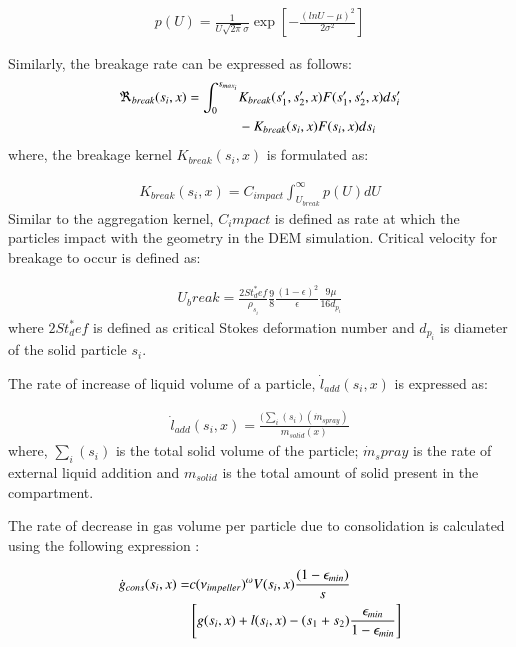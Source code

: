 \documentclass[preprint,10pt,authoryear,review]{elsarticle}
\begin{document}
\begin{linenumbers}
\begin{align}
p(U) = \frac{1}{U\sqrt{2\pi}\sigma}\exp\left[-\frac{(lnU-\mu)^2}{2\sigma^2}\right]
\label{eqn:mthds_pbm_agg_lognormVelo}
\end{align}

Similarly, the breakage rate can be expressed as follows:
\begin{align}
\Re_{break}(s_i,x)  = \int_0^{s_{max_i}} & \notag
K_{break}(s_1',s_2',x)F(s_1',s_2',x)ds_i' \\ &  - K_{break}(s_i,x)F(s_i,x)ds_i
\label{eqn:mthds_pbm_breakage_geneq}
\end{align}   
where, the breakage kernel $K_{break}(s_i,x)$ is formulated as: 

\begin{align}
K_{break}(s_i,x) = C_{impact}\int_{U_{break}}^{\infty}p(U)dU
\label{eqn:mthds_pbm_breakage_kernel}
\end{align}
Similar to the aggregation kernel, $C_impact$ is defined as rate at which 
the particles impact with the geometry in the DEM simulation. Critical velocity 
for breakage to occur is defined as:

\begin{align}
U_break=\frac{2St^*_def}{\rho_{s_i}}\frac{9}{8}\frac{(1-\epsilon)^2}{\epsilon}\frac{9\mu}{16d_{p_i}}
\label{eqn:mthds_pbm_breakage_ubreak}
\end{align}
where $2St^*_def$ is defined as critical Stokes deformation number \citep{Iveson2001} and 
$d_{p_i}$ is diameter of the solid particle $s_i$.


The rate of increase of liquid volume of a particle, 
$\dot{l}_{add}(s_i,x)$ is expressed as:

\begin{align}
\dot{l}_{add}(s_i,x) = \frac{(\sum_i(s_i)(\dot{m}_{spray})}{m_{solid}(x)}
\label{eqn:mthds_liq_addn_rate}
\end{align}
where, $\sum_i(s_i)$  is the total solid volume of the particle; $\dot{m}_spray$ is the 
rate of external liquid addition and $m_{solid}$ is the total amount of solid present in the compartment.

The rate of decrease in gas volume per particle due to consolidation is calculated using the 
following expression \citep{Verkoeijen2002}:

\begin{align}
\dot{g}_{cons}(s_i,x)=&c (\nu_{impeller})^{\omega}V(s_i,x)\frac{(1-\epsilon_{min})}{s} 
\notag \\ 
& \left[g(s_i,x)+l(s_i,x) -(s_1+s_2)\frac{\epsilon_{min}}{1-\epsilon_{min}}\right]
\label{eqn:mthds_rate_gas_vol_part}
\end{align}        


\end{linenumbers}
\end{document}
